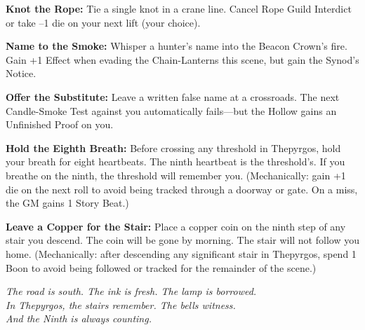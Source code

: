 \documentclass[10pt,twocolumn]{book}
\begin{document}
\textbf{Knot the Rope:} Tie a single knot in a crane line. Cancel Rope Guild Interdict or take --1 die on your next lift (your choice).

\textbf{Name to the Smoke:} Whisper a hunter's name into the Beacon Crown's fire. Gain +1 Effect when evading the Chain-Lanterns this scene, but gain the Synod's Notice.

\textbf{Offer the Substitute:} Leave a written false name at a crossroads. The next Candle-Smoke Test against you automatically fails---but the Hollow gains an Unfinished Proof on you.

\textbf{Hold the Eighth Breath:} Before crossing any threshold in Thepyrgos, hold your breath for eight heartbeats. The ninth heartbeat is the threshold's. If you breathe on the ninth, the threshold will remember you. (Mechanically: gain +1 die on the next roll to avoid being tracked through a doorway or gate. On a miss, the GM gains 1 Story Beat.)

\textbf{Leave a Copper for the Stair:} Place a copper coin on the ninth step of any stair you descend. The coin will be gone by morning. The stair will not follow you home. (Mechanically: after descending any significant stair in Thepyrgos, spend 1 Boon to avoid being followed or tracked for the remainder of the scene.)

\vfill
\begin{center}
\textit{The road is south. The ink is fresh. The lamp is borrowed.}\\
\textit{In Thepyrgos, the stairs remember. The bells witness.}\\
\textit{And the Ninth is always counting.}
\end{center}
\end{document}
